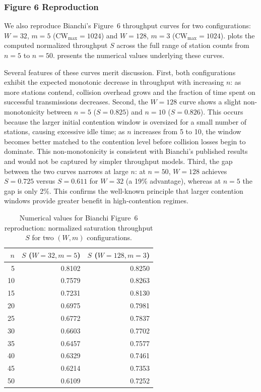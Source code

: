 \documentclass[conference]{IEEEtran}
\begin{document}
\subsubsection{Figure 6 Reproduction}

We also reproduce Bianchi's Figure~6 throughput curves for two
configurations: $W{=}32$, $m{=}5$ (CW$_{\max}{=}1024$) and $W{=}128$,
$m{=}3$ (CW$_{\max}{=}1024$).   plots the
computed normalized throughput $S$ across the full range of station
counts from $n{=}5$ to $n{=}50$.   presents
the numerical values underlying these curves.

Several features of these curves merit discussion.  First, both
configurations exhibit the expected monotonic decrease in throughput with
increasing $n$: as more stations contend, collision overhead grows and
the fraction of time spent on successful transmissions decreases.
Second, the $W{=}128$ curve shows a slight non-monotonicity between
$n{=}5$ ($S = 0.825$) and $n{=}10$ ($S = 0.826$).  This occurs because
the larger initial contention window is oversized for a small number of
stations, causing excessive idle time; as $n$ increases from 5 to 10,
the window becomes better matched to the contention level before
collision losses begin to dominate.  This non-monotonicity is consistent
with Bianchi's published results and would not be captured by simpler
throughput models.  Third, the gap between the two curves narrows at
large $n$: at $n{=}50$, $W{=}128$ achieves $S = 0.725$ versus $S = 0.611$
for $W{=}32$ (a 19\% advantage), whereas at $n{=}5$ the gap is only 2\%.
This confirms the well-known principle that larger contention windows
provide greater benefit in high-contention regimes.

\begin{table}[t]
\centering
\caption{Numerical values for Bianchi Figure~6 reproduction:
normalized saturation throughput $S$ for two $(W, m)$ configurations.}
\label{tab:bianchi_fig6}
\begin{tabular}{@{}rrr@{}}
\toprule
$n$ & $S$ ($W{=}32, m{=}5$) & $S$ ($W{=}128, m{=}3$) \\
\midrule
5  & 0.8102 & 0.8250 \\
10 & 0.7579 & 0.8263 \\
15 & 0.7231 & 0.8130 \\
20 & 0.6975 & 0.7981 \\
25 & 0.6772 & 0.7837 \\
30 & 0.6603 & 0.7702 \\
35 & 0.6457 & 0.7577 \\
40 & 0.6329 & 0.7461 \\
45 & 0.6214 & 0.7353 \\
50 & 0.6109 & 0.7252 \\
\bottomrule
\end{tabular}
\end{table}
\end{document}
